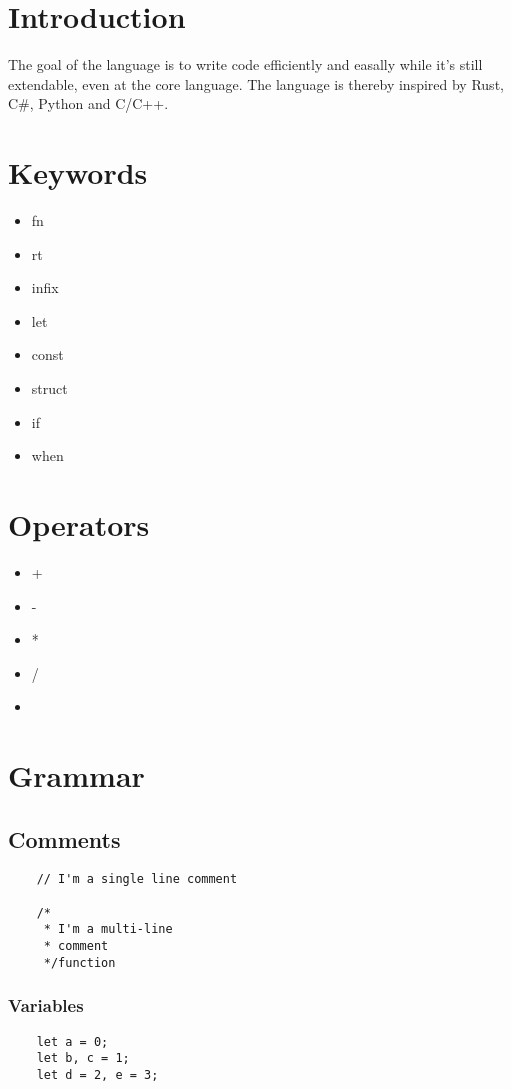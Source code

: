 \documentclass{report}
\begin{document}
\chapter{Introduction}
The goal of the language is to write code efficiently and easally while it's still extendable, even at the core language.
The language is thereby inspired by Rust, C\#, Python and C/C++.



\chapter{Keywords}
\begin{itemize}
    \item{fn}
    \item{rt}
    \item{infix}
    \item{let}
    \item{const}
    \item{struct}
    \item{if}
    \item{when}
\end{itemize}



\chapter{Operators}
\begin{itemize}
    \item{+}
    \item{-}
    \item{*}
    \item{/}
    \item{}
\end{itemize}


\chapter{Grammar}
\section{Comments}
\begin{verbatim}
    // I'm a single line comment

    /*
     * I'm a multi-line 
     * comment
     */function
\end{verbatim}
\subsection{Variables}
\begin{verbatim}
    let a = 0;
    let b, c = 1;
    let d = 2, e = 3;
\end{verbatim}
\end{document}

